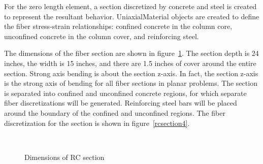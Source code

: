 \documentclass[12pt]{article}
\begin{document}
For the zero length element, a section discretized by concrete
and steel is created to represent the resultant behavior.
UniaxialMaterial objects are created to define the fiber
stress-strain relationships: confined concrete in the column core,
unconfined concrete in the column cover, and reinforcing steel.

The dimensions of the fiber section are shown in
figure~\ref{rcsection0}. The section depth is
24 inches, the width is 15 inches, and there are 1.5 inches of cover
around the entire section. Strong axis bending is about the section
z-axis. In fact, the section z-axis is the strong axis of bending
for all fiber sections in planar problems. The section is separated
into confined and unconfined concrete regions, for which separate
fiber discretizations will be 
generated. Reinforcing steel bars will be placed around the boundary
of the confined and unconfined regions.
The fiber discretization for the section is shown in
figure~\ref{rcsection4}.


\begin{figure}[h]
\begin{center}
\leavevmode
\hbox{%
\epsfxsize=4.0in
}
\end{center}
\caption{Dimensions of RC section}
\label{rcsection0}
\end{figure}




\end{document}

